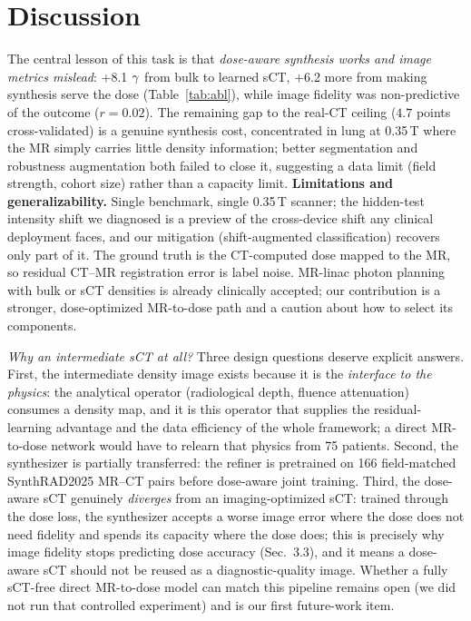 \documentclass{llncs}
\begin{document}
\section{Discussion}
The central lesson of this task is that \emph{dose-aware synthesis works and image metrics
mislead}: +8.1 $\gamma$ from bulk to learned sCT, +6.2 more from making synthesis serve the dose
(Table~\ref{tab:abl}), while image fidelity was non-predictive of the outcome ($r{=}0.02$). The
remaining gap to the real-CT ceiling ($4.7$ points cross-validated) is a genuine synthesis cost,
concentrated in lung at 0.35\,T where the MR simply carries little density information; better
segmentation and robustness augmentation both failed to close it, suggesting a data limit
(field strength, cohort size) rather than a capacity limit. \textbf{Limitations and
generalizability.} Single benchmark, single 0.35\,T scanner; the hidden-test intensity shift we
diagnosed is a preview of the cross-device shift any clinical deployment faces, and our
mitigation (shift-augmented classification) recovers only part of it. The ground truth is the
CT-computed dose mapped to the MR, so residual CT--MR registration error is label noise.
MR-linac photon planning with bulk or sCT densities is already clinically accepted; our
contribution is a stronger, dose-optimized MR-to-dose path and a caution about how to select
its components.

\emph{Why an intermediate sCT at all?} Three design questions deserve explicit answers.
First, the intermediate density image exists because it is the \emph{interface to the physics}:
the analytical operator (radiological depth, fluence attenuation) consumes a density map, and it
is this operator that supplies the residual-learning advantage and the data efficiency of the
whole framework; a direct MR-to-dose network would have to relearn that physics from 75
patients. Second, the synthesizer is partially transferred: the refiner is pretrained on 166
field-matched SynthRAD2025 MR--CT pairs before dose-aware joint training. Third, the dose-aware
sCT genuinely \emph{diverges} from an imaging-optimized sCT: trained through the dose loss, the
synthesizer accepts a worse image error where the dose does not need fidelity and spends its
capacity where the dose does; this is precisely why image fidelity stops predicting dose
accuracy (Sec.~3.3), and it means a dose-aware sCT should not be reused as a diagnostic-quality
image. Whether a fully sCT-free direct MR-to-dose model can match this pipeline remains open (we
did not run that controlled  experiment) and is our first future-work item.
\end{document}
